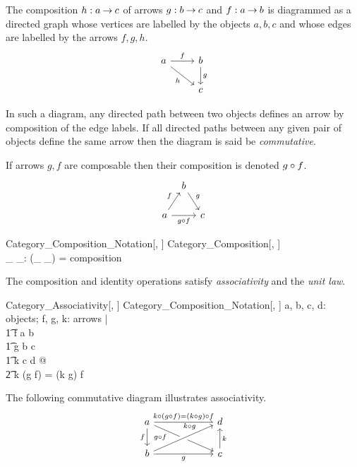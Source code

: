 \documentclass{amsart}
\begin{document}
The composition $h: a \mathbin{\rightarrow} c$ of arrows $g: b \mathbin{\rightarrow} c$ and $f: a \mathbin{\rightarrow} b$ is diagrammed as a directed graph whose 
vertices are labelled by the objects $a, b, c$ and whose edges are labelled by the arrows $f, g, h$.
$$
  \begin{tikzcd}
    a \arrow{r}{f} \arrow[swap]{dr}{h} & b \arrow{d}{g} \\
     & c
  \end{tikzcd}
$$

In such a diagram, any directed path between two objects defines an arrow by composition of the edge labels.
If all directed paths between any given pair of objects define the same arrow then the diagram is said be \textit{commutative}.

If arrows $g, f$ are composable then their composition is denoted $g \mathbin{\circ} f$.
$$
\begin{tikzcd}[column sep=tiny]
& b \arrow{rd}{g} & \\
a \arrow{ru}{f} \arrow[swap]{rr}{g \compCat f} & & c
\end{tikzcd}
$$

\begin{schema}{Category\_Composition\_Notation}[\genO, \genA]
	Category\_Composition[\genO, \genA] \\
	\_ \compCat \_: \genA \cross \genA \pfun \genA
\where
	(\_ \compCat \_) = composition
\end{schema}

The composition and identity operations satisfy \textit{associativity} and the \textit{unit law}.
\begin{schema}{Category\_Associativity}[\genO, \genA]
	Category\_Composition\_Notation[\genO, \genA]
\where
	\forall a, b, c, d: objects; f, g, k: arrows | \\
	\t1	f \in a \arrCat b \land \\
	\t1	g \in b \arrCat c \land \\
	\t1	k \in c \arrCat  d @\\
	\t2		k \compCat (g \compCat f) = (k \compCat g) \compCat f
\end{schema}

The following commutative diagram illustrates associativity.
$$
\begin{tikzcd}[column sep=6em]
a \arrow[swap]{d}{f} 
\arrow{r}{k \compCat (g \compCat f) = (k \compCat g) \compCat f} 
\arrow[swap]{rd}[near start]{g \compCat f} & 
d \\
b \arrow[swap]{r}{g} 
\arrow[crossing over]{ru}[near end]{k \compCat g}& 
c \arrow[swap]{u}{k}
\end{tikzcd}
$$
\end{document}
